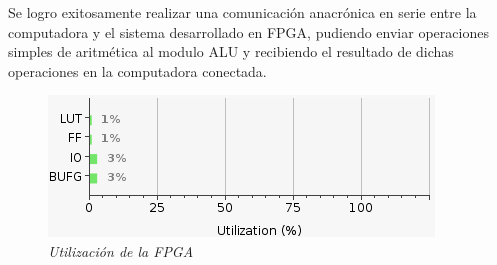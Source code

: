 \documentclass[12pt,A4paper,titlepage]{article}
\begin{document}
Se logro exitosamente realizar una comunicación anacrónica en serie entre la computadora y el sistema desarrollado en FPGA, pudiendo enviar operaciones simples de aritmética al modulo ALU y recibiendo el resultado de dichas operaciones en la computadora conectada.


\begin{figure}[H] 
	\centering
	\includegraphics{figure/utilizacion-UART.png}
	\caption{\textit{Utilización de la FPGA}}
\end{figure}
\end{document}
